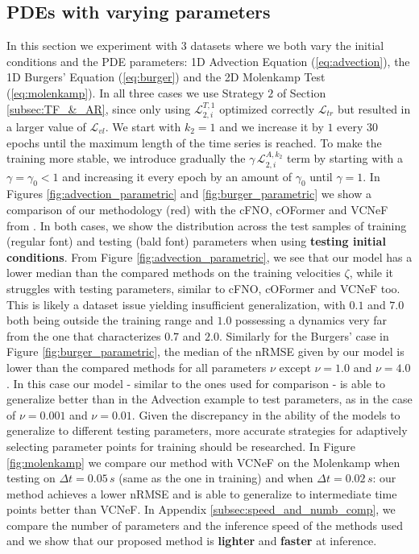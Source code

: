 \subsection{PDEs with varying parameters}
\label{subsec:PDE_varying}
In this section we experiment with $3$ datasets where we both vary the initial conditions and the PDE parameters: 1D Advection Equation (\ref{eq:advection}), the 1D Burgers' Equation (\ref{eq:burger}) and the 2D Molenkamp Test (\ref{eq:molenkamp}). In all three cases we use Strategy $2$ of Section \ref{subsec:TF_&_AR}, since only using $\mathcal{L}_{2,i}^{T,1}$ optimized correctly $\mathcal{L}_{tr}$ but resulted in a larger value of $\mathcal{L}_{vl}$. We start with $k_2 =1$ and we increase it by $1$ every $30$ epochs until the maximum length of the time series is reached. To make the training more stable, we introduce gradually the $\gamma\,\mathcal{L}_{2,i}^{A,k_2}$ term by starting with a $\gamma = \gamma_0<1$ and increasing it every epoch by an amount of $\gamma_0$ until $\gamma=1$. In Figures \ref{fig:advection_parametric} and \ref{fig:burger_parametric} we show a comparison of our methodology (red) with the cFNO, cOFormer and VCNeF from \cite{vcnef-hagnberger:2024}. In both cases, we show the distribution across the test samples of training (regular font) and testing (bald font) parameters when using \textbf{testing initial conditions}. From Figure \ref{fig:advection_parametric}, we see that our model has a lower median than the compared methods on the training velocities $\zeta$, while it struggles with testing parameters, similar to cFNO, cOFormer and VCNeF too. This is likely a dataset issue yielding insufficient generalization, with $0.1$ and $7.0$ both being outside the training range and $1.0$ possessing a dynamics very far from the one that characterizes $0.7$ and $2.0$. Similarly for the Burgers' case in Figure \ref{fig:burger_parametric}, the median of the nRMSE given by our model is lower than the compared methods for all parameters $\nu$ except $\nu=1.0$ and $\nu=4.0$. In this case our model - similar to the ones used for comparison - is able to generalize better than in the Advection example to test parameters, as in the case of $\nu=0.001$ and $\nu=0.01$. Given the discrepancy in the ability of the models to generalize to different testing parameters, more accurate strategies for adaptively selecting parameter points for training should be researched. In Figure \ref{fig:molenkamp} we compare our method with VCNeF on the Molenkamp when testing on $\Delta t = 0.05\,s$ (same as the one in training) and when $\Delta t = 0.02\,s$: our method achieves a lower nRMSE and is able to generalize to intermediate time points better than VCNeF. In Appendix \ref{subsec:speed_and_numb_comp}, we compare the number of parameters and the inference speed of the methods used and we show that our proposed method is \textbf{lighter} and \textbf{faster} at inference.
